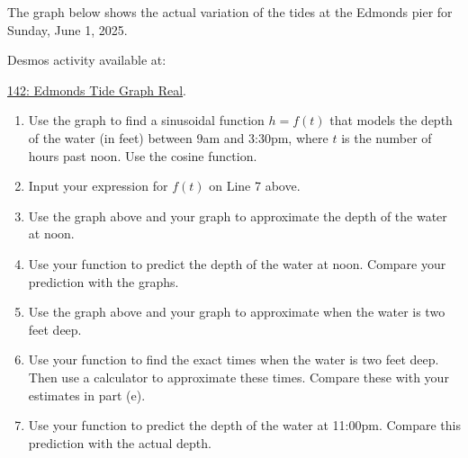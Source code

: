 \documentclass{ximera}
\begin{document}
\begin{example} \label{EXPODFefeRE}
The graph below shows the actual variation of the tides at the Edmonds pier for Sunday, June 1, 2025.


Desmos activity available at:

\href{https://www.desmos.com/calculator/kbjvcy5bs1}{142: Edmonds Tide Graph Real}.

 
\begin{onlineOnly}
    \begin{center}
\end{center}
\end{onlineOnly}

\begin{enumerate}
\item Use the graph to find a sinusoidal function $h=f(t)$ that models the depth of the water (in feet) between 9am and 3:30pm, where $t$ is the number of hours past noon. Use the cosine function.

\item Input your expression for $f(t)$ on Line 7 above.

\item Use the graph above and  your graph to approximate the depth of the water at noon.

\item Use your function to predict the depth of the water at noon. Compare your prediction with the graphs.

\item Use the graph above and  your graph to approximate when the water is two feet deep.


\item Use your function to find the exact times when the water is two feet deep. Then use a calculator to approximate these times.  Compare these with your estimates in part (e).

\item Use your function to predict the depth of the water at 11:00pm. Compare this prediction with the actual depth.
\end{enumerate}



\end{example}
\end{document}
